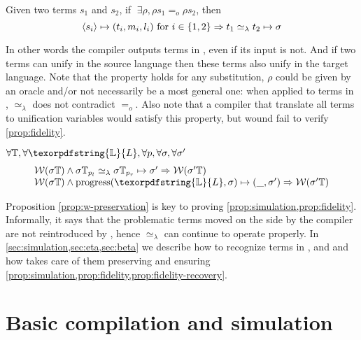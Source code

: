 \documentclass[sigconf,natbib=false,review]{acmart}
\newcommand{\EqualRel}{\ensuremath{=}}
\newcommand{\UnifRel}{\ensuremath{\simeq}}
\newcommand{\Eo}{\ensuremath{\EqualRel_o}\xspace}
\newcommand{\Ue}{\ensuremath{\UnifRel_\lambda}\xspace}
\newcommand{\linkStore}{\texorpdfstring{\ensuremath{\mathbb{L}}\xspace}{L}}
\newcommand{\hoUnifPb}{\ensuremath{\mathbb{T}}\xspace}
\begin{document}
\begin{proposition}\label{prop:w-noncontra}
  Given two terms $s_1$ and $s_2$, if $\;\exists \rho, \rho s_1 \Eo \rho s_2$,
  then 
  $$
    \C{s_i}{t_i}{m_i}{l_i} ~\mathrm{for}~ i \in \{ 1,2 \} \Rightarrow
    t_1 \Ue t_2 \mapsto \sigma \label{prop:compilation-w}
  $$
\end{proposition}

\noindent
In other words the compiler outputs terms in \wellb, even if its
input is not. And if two terms can unify in the source language
then these terms also unify in the target language. 
Note that the property holds for any substitution, $\rho$ could be given by an
oracle and/or not necessarily be a most general one: when applied to terms in \wellb,
\Ue{} does not contradict \Eo. Also note that a compiler that
translate all terms to unification variables would satisfy this
property, but wound fail to verify \cref{prop:fidelity}.

\begin{proposition}\label{prop:w-preservation}
$\forall \hoUnifPb, \forall \linkStore, \forall p, \forall \sigma, \forall \sigma'$
$$
\begin{array}{l}
\wellb(\sigma\hoUnifPb) \land
  \sigma\hoUnifPb_{p_l} \Ue \sigma\hoUnifPb_{p_r} \mapsto {\sigma'}
  \Rightarrow \wellb(\sigma' \hoUnifPb)\\
\wellb(\sigma\hoUnifPb) \land
  \progress(\linkStore,\sigma) \mapsto (\_,\sigma')
  \Rightarrow \wellb(\sigma' \hoUnifPb)
\end{array}
$$
\end{proposition}

\noindent
Proposition \ref{prop:w-preservation} is key to proving \cref{prop:simulation,prop:fidelity}.
Informally, it says that the problematic terms moved on the side by the compiler
are not reintroduced by \hstep, hence \Ue{} can continue to operate properly.
In \cref{sec:simulation,sec:eta,sec:beta}
we describe how to %
recognize terms in \maybebeta, \maybeeta and
\notllambda and how \progress takes care of them preserving \wellb
and ensuring \cref{prop:simulation,prop:fidelity,prop:fidelity-recovery}.


\section{Basic compilation and simulation}
\label{sec:simulation}
\end{document}
